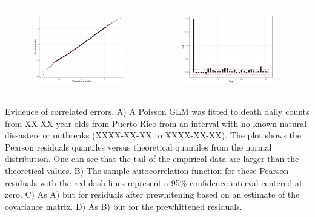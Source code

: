 \documentclass[11pt]{article}
\begin{document}
\begin{suppfigure}[ht]
\begin{tabular}{lll}
\begin{subfigure}[t]{0.49\linewidth}
		\centering
		\includegraphics[width=1\linewidth]{figs/supp-figure-2c.pdf}
	\end{subfigure}&
	\begin{subfigure}[t]{0.49\linewidth}
    	\centering
	    \includegraphics[width=1\linewidth]{figs/supp-figure-2d.pdf}
    \end{subfigure}\\
    \end{tabular}
    \caption{Evidence of correlated errors. A) A Poisson GLM was fitted to death daily counts from XX-XX year olds from Puerto Rico from an interval with no known natural dissasters or outbreaks (XXXX-XX-XX to XXXX-XX-XX). The plot shows the Pearson residuals quantiles versus theoretical quantiles from the normal distribution. One can see that the tail of the empirical data are larger than the theoretical values. B) The sample autocorrelation function for these Pearson residuals with the red-dash lines represent a 95\% confidence interval centered at zero. C) As A) but for residuals after prewhitening based on an estimate of the covariance matrix. D) As B) but for the prewhittened residuals.}
    \label{supp-fig:correlated-errors}
\end{suppfigure}
\end{document}
